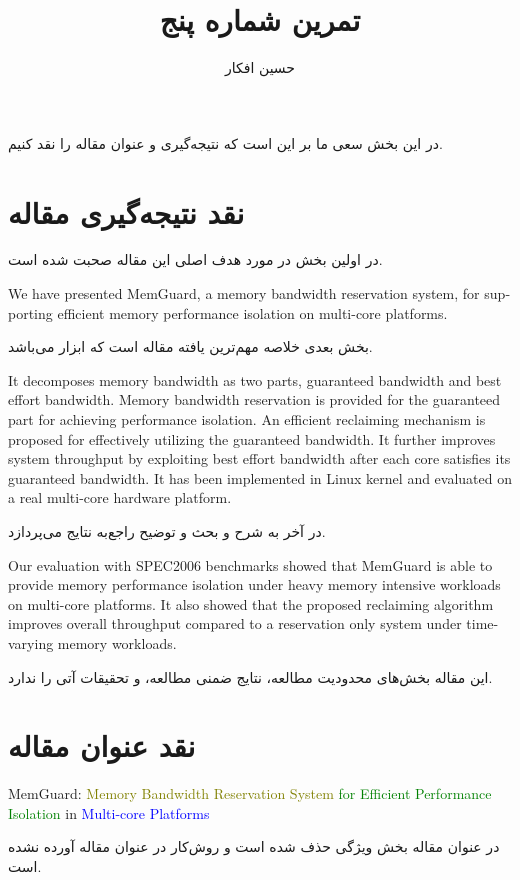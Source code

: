 \documentclass[a4paper, 11pt]{article}
\title{
    تمرین شماره پنج
}
\author{حسین افکار}
\begin{document}
\maketitle
در این بخش سعی ما بر این است که نتیجه‌گیری و عنوان مقاله را نقد کنیم.
\section{نقد نتیجه‌گیری مقاله}
در اولین بخش در مورد هدف اصلی این مقاله صحبت شده است.
\begin{latin}
We have presented MemGuard, a memory bandwidth reservation system,
for supporting efficient memory performance
isolation on multi-core platforms.
\end{latin}
بخش بعدی خلاصه مهم‌ترین یافته مقاله است که ابزار
می‌باشد.
\begin{latin}
It decomposes memory
bandwidth as two parts, guaranteed bandwidth and best effort
bandwidth. Memory bandwidth reservation is provided for
the guaranteed part for achieving performance isolation. An
efficient reclaiming mechanism is proposed for effectively
utilizing the guaranteed bandwidth. It further improves system
throughput by exploiting best effort bandwidth after each core
satisfies its guaranteed bandwidth. It has been implemented
in Linux kernel and evaluated on a real multi-core hardware
platform.
\end{latin}
در آخر به شرح و بحث و توضیح راجع‌به نتایج می‌پردازد.
\begin{latin}
Our evaluation with SPEC2006 benchmarks showed that
MemGuard is able to provide memory performance isolation
under heavy memory intensive workloads on multi-core platforms.
It also showed that the proposed reclaiming algorithm
improves overall throughput compared to a reservation only
system under time-varying memory workloads.
\end{latin}
این مقاله بخش‌های محدودیت مطالعه، نتایج ضمنی مطالعه، و تحقیقات آتی را ندارد.
\section{نقد عنوان مقاله}
\begin{latin}
MemGuard: \textcolor{olive}{Memory Bandwidth Reservation
System} \textcolor{green}{for Efficient Performance Isolation} in
\textcolor{blue}{Multi-core Platforms}
\end{latin}
در عنوان مقاله بخش ویژگی حذف شده است و روش‌کار در عنوان مقاله آورده نشده است.

\end{document}
